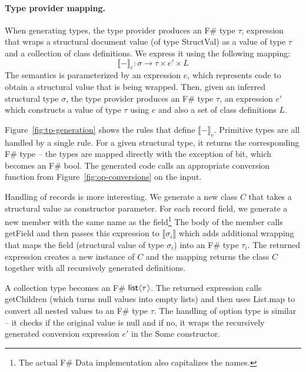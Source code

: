 \documentclass[preprint]{sigplanconf}
\newcommand{\langl}{\begin{picture}(4.5,7)
\put(1.1,2.5){\rotatebox{60}{\line(1,0){5.5}}}
\put(1.1,2.5){\rotatebox{300}{\line(1,0){5.5}}}
\end{picture}}
\newcommand{\rangl}{\begin{picture}(4.5,7)
\put(.9,2.5){\rotatebox{120}{\line(1,0){5.5}}}
\put(.9,2.5){\rotatebox{240}{\line(1,0){5.5}}}
\end{picture}}
\newcommand{\kvd}[1]{\textnormal{\textcolor{kvdclr}{\sffamily #1}}}
\newcommand{\ident}[1]{\textnormal{\sffamily #1}}
\newcommand{\sem}[1]{\llbracket #1 \rrbracket}
\begin{document}
\paragraph{Type provider mapping.}
When generating types, the type provider produces an F\# type $\tau$, expression that wraps a structural 
document value (of type \ident{StructVal}) as a value of type $\tau$ and a collection of class definitions. 
We express it using the following mapping:
%
\begin{equation*}
\sem{-}_e : \sigma \rightarrow \tau \times e' \times L
\end{equation*}
%
The semantics is parameterized by an expression $e$, which represents code to obtain a structural value that is
being wrapped. Then, given an inferred structural type $\sigma$, the type provider produces an F\# type $\tau$,
an expression $e'$ which constructs a value of type $\tau$ using $e$ and also a set of class definitions $L$.

Figure~\ref{fig:tp-generation} shows the rules that define $\sem{-}_e$. Primitive types are all
handled by a single rule. For a given structural type, it returns the corresponding F\# type -- the types are
mapped directly with the exception of \ident{bit}, which becomes an F\# \ident{bool}. The generated code calls
an appropriate conversion function from Figure~\ref{fig:op-conversions} on the input.

Handling of records is more interesting. We generate a new class $C$ that takes a structural value as constructor
parameter. For each record field, we generate a new member with the same name as the field\footnote{The actual
F\# Data implementation also capitalizes the names.} The body of the member calls \ident{getField} and then
passes this expression to $\sem{\sigma_i}$ which adds additional wrapping that maps the field (structural value
of type $\sigma_i$) into an F\# type $\tau_i$. The returned expression creates a new instance of $C$ and
the mapping returns the class $C$ together with all recursively generated definitions.

A collection type becomes an F\# $\ident{list}\langl\tau\rangl$. The returned expression calls \ident{getChildren}
(which turns \kvd{null} values into empty lists) and then uses \ident{List.map} to convert all nested values to 
an F\# type $\tau$. The handling of option type is similar -- it checks if the original value is \kvd{null} and
if no, it wraps the recursively generated conversion expression $e'$ in the \ident{Some} constructor.
\end{document}

